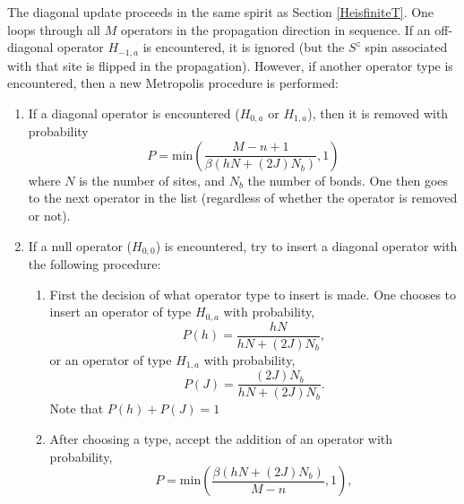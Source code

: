 \documentclass[vecphys]{svmult}
\begin{document}
The diagonal update proceeds in the same spirit as Section \ref{HeisfiniteT}.  One loops through all $M$ operators in the propagation direction in sequence. If an off-diagonal operator $H_{-1,a}$ is encountered, it is ignored (but the $S^z$ spin associated with that site is flipped in the propagation).  However, if another operator type is encountered, then a new Metropolis procedure is performed:
\begin{enumerate}
\item If a diagonal operator is encountered ($H_{0,a}$ or $H_{1,a}$), then it is removed with probability
\begin{equation}
P = \mathrm{min}\left( \frac{M-n+1}{\beta(hN + (2J)N_b)},1\right)
\end{equation}
where $N$ is the number of sites, and $N_b$ the number of bonds.  
One then goes to the next operator in the list (regardless of whether the operator is removed or not).
\item If a null operator ($H_{0,0}$) is encountered,  try to insert a diagonal operator with the following procedure:
\begin{enumerate}
\item First the decision of what operator type to insert is made.  One chooses to insert an operator of type $H_{0,a}$ with probability,
\begin{equation}
P(h) = \frac{h N}{hN + (2J)N_b},
\end{equation}
or an operator of type $H_{1,a}$ with probability,
\begin{equation}
P(J) = \frac{(2J)N_b}{hN + (2J)N_b} .
\end{equation}
Note that $P(h) + P(J) = 1$
\item After choosing a type, accept the addition of an operator with probability,
\begin{equation}
P = \mathrm{min}\left(\frac{\beta(hN + (2J)N_b)}{M-n},1\right),

\end{equation}
\end{enumerate}
\end{enumerate}
\end{document}
